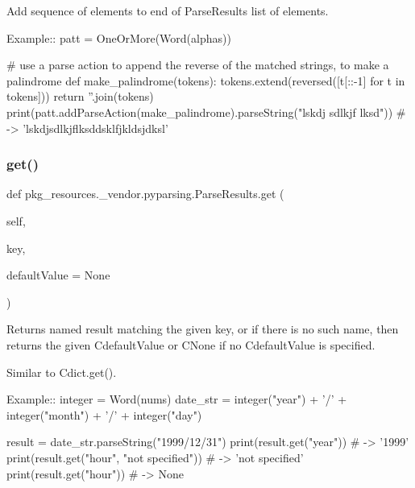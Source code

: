 \begin{DoxyVerb}Add sequence of elements to end of ParseResults list of elements.

Example::
    patt = OneOrMore(Word(alphas))
    
    # use a parse action to append the reverse of the matched strings, to make a palindrome
    def make_palindrome(tokens):
tokens.extend(reversed([t[::-1] for t in tokens]))
return ''.join(tokens)
    print(patt.addParseAction(make_palindrome).parseString("lskdj sdlkjf lksd")) # -> 'lskdjsdlkjflksddsklfjkldsjdksl'
\end{DoxyVerb}
 \mbox{\label{classpkg__resources_1_1__vendor_1_1pyparsing_1_1_parse_results_a2ebba8b6bb0c2553f02fa40912e5d830}} 
\subsubsection{\texorpdfstring{get()}{get()}}
{\footnotesize\ttfamily def pkg\+\_\+resources.\+\_\+vendor.\+pyparsing.\+Parse\+Results.\+get (\begin{DoxyParamCaption}\item[{}]{self,  }\item[{}]{key,  }\item[{}]{default\+Value = {\ttfamily None} }\end{DoxyParamCaption})}

\begin{DoxyVerb}Returns named result matching the given key, or if there is no
such name, then returns the given C{defaultValue} or C{None} if no
C{defaultValue} is specified.

Similar to C{dict.get()}.

Example::
    integer = Word(nums)
    date_str = integer("year") + '/' + integer("month") + '/' + integer("day")           

    result = date_str.parseString("1999/12/31")
    print(result.get("year")) # -> '1999'
    print(result.get("hour", "not specified")) # -> 'not specified'
    print(result.get("hour")) # -> None
\end{DoxyVerb}
 \mbox{\label{classpkg__resources_1_1__vendor_1_1pyparsing_1_1_parse_results_a84fe6f0686f055144e26c2102c535689}} 
